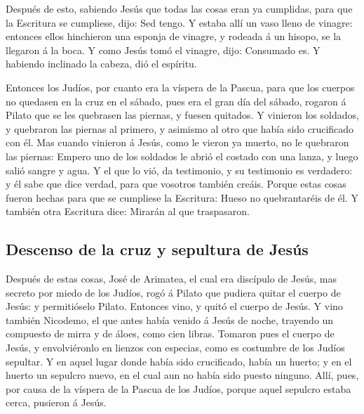  Después de esto, sabiendo Jesús que todas las cosas eran
ya cumplidas, para que la Escritura se cumpliese, dijo: Sed tengo.
 Y estaba allí un vaso lleno de vinagre: entonces ellos
hinchieron una esponja de vinagre, y rodeada á un hisopo, se la llegaron
á la boca.  Y como Jesús tomó el vinagre, dijo: Consumado
es. Y habiendo inclinado la cabeza, dió el espíritu.

 Entonces los Judíos, por cuanto era la víspera de la
Pascua, para que los cuerpos no quedasen en la cruz en el sábado, pues
era el gran día del sábado, rogaron á Pilato que se les quebrasen las
piernas, y fuesen quitados.  Y vinieron los soldados, y
quebraron las piernas al primero, y asimismo al otro que había sido
crucificado con él.  Mas cuando vinieron á Jesús, como le
vieron ya muerto, no le quebraron las piernas:  Empero
uno de los soldados le abrió el costado con una lanza, y luego salió
sangre y agua.  Y el que lo vió, da testimonio, y su
testimonio es verdadero: y él sabe que dice verdad, para que vosotros
también creáis.  Porque estas cosas fueron hechas para
que se cumpliese la Escritura: Hueso no quebrantaréis de él.
 Y también otra Escritura dice: Mirarán al que
traspasaron.

\hypertarget{descenso-de-la-cruz-y-sepultura-de-jesuxfas}{%
\subsection{Descenso de la cruz y sepultura de
Jesús}\label{descenso-de-la-cruz-y-sepultura-de-jesuxfas}}

 Después de estas cosas, José de Arimatea, el cual era
discípulo de Jesús, mas secreto por miedo de los Judíos, rogó á Pilato
que pudiera quitar el cuerpo de Jesús: y permitióselo Pilato. Entonces
vino, y quitó el cuerpo de Jesús.  Y vino también
Nicodemo, el que antes había venido á Jesús de noche, trayendo un
compuesto de mirra y de áloes, como cien libras.  Tomaron
pues el cuerpo de Jesús, y envolviéronlo en lienzos con especias, como
es costumbre de los Judíos sepultar.  Y en aquel lugar
donde había sido crucificado, había un huerto; y en el huerto un
sepulcro nuevo, en el cual aun no había sido puesto ninguno.
 Allí, pues, por causa de la víspera de la Pascua de los
Judíos, porque aquel sepulcro estaba cerca, pusieron á Jesús.

